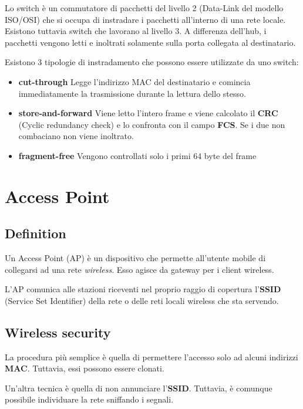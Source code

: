 \documentclass[a4paper]{article}
\begin{document}
Lo switch è un commutatore di pacchetti del livello 2 (Data-Link del modello ISO/OSI)
che si occupa di instradare i pacchetti all'interno di una rete locale.
Esistono tuttavia switch che lavorano al livello 3.
A differenza dell'hub, i pacchetti vengono letti e inoltrati solamente sulla porta collegata al destinatario.

Esistono 3 tipologie di instradamento che possono essere utilizzate da uno switch:

\begin{itemize}
    \item \textbf{cut-through} Legge l'indirizzo MAC del destinatario e comincia immediatamente la trasmissione
        durante la lettura dello stesso.
    \item \textbf{store-and-forward} Viene letto l'intero frame e viene calcolato il \textbf{CRC} (Cyclic redundancy check)
        e lo confronta con il campo \textbf{FCS}. Se i due non combaciano non viene inoltrato.
    \item \textbf{fragment-free} Vengono controllati solo i primi 64 byte del frame
\end{itemize}

\section{Access Point}

\subsection{Definition}

Un Access Point (AP) è un dispositivo che permette all'utente mobile di collegarsi ad una rete
\textit{wireless}. Esso agisce da gateway per i client wireless.

L'AP comunica alle stazioni riceventi nel proprio raggio di copertura l'\textbf{SSID} (Service Set Identifier)
della rete o delle reti locali wireless che sta servendo.

\pagebreak

\subsection{Wireless security}

La procedura più semplice è quella di permettere l'accesso solo ad alcuni indirizzi \textbf{MAC}.
Tuttavia, essi possono essere clonati.

Un'altra tecnica è quella di non annunciare l'\textbf{SSID}. Tuttavia, è comunque possibile
individuare la rete sniffando i segnali.
\end{document}
